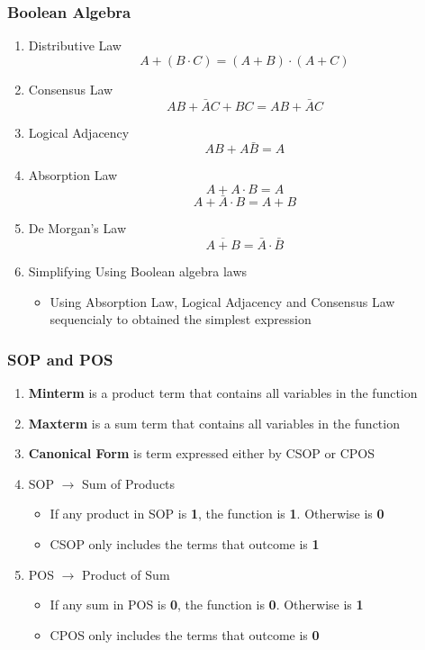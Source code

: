 \documentclass{article}
\begin{document}
\subsubsection{Boolean Algebra}
\begin{enumerate}
    \item Distributive Law
    \[A + (B \cdot C)=(A+B)\cdot(A+C)\]
    \item Consensus Law
    \[AB + \bar{A}C+BC=AB+\bar{A}C\]
    \item Logical Adjacency
    \[AB+A\bar{B}=A\]
    \item Absorption Law
    \[A+A\cdot B=A\]
    \[A+\bar{A} \cdot B=A+B\]
    \item De Morgan's Law
    \[\overline{A+B}=\bar{A} \cdot \bar{B}\]
    \item Simplifying Using Boolean algebra laws
    \begin{itemize}
        \item Using Absorption Law, Logical Adjacency and Consensus Law sequencialy to obtained the simplest expression
    \end{itemize}
\end{enumerate}

\subsubsection{SOP and POS}
\begin{enumerate}
    \item \textbf{Minterm} is a product term that contains all variables in the function
    \item \textbf{Maxterm} is a sum term that contains all variables in the function
    \item \textbf{Canonical Form} is term expressed either by CSOP or CPOS
    \item SOP $\rightarrow$ Sum of Products
    \begin{itemize}
        \item If any product in SOP is \textbf{1}, the function is \textbf{1}. Otherwise is \textbf{0}
        \item CSOP only includes the terms that outcome is \textbf{1}
    \end{itemize}
    \item POS $\rightarrow$ Product of Sum
        \begin{itemize}
            \item If any sum in POS is \textbf{0}, the function is \textbf{0}. Otherwise is \textbf{1}
            \item CPOS only includes the terms that outcome is \textbf{0}
        \end{itemize}
\end{enumerate}
\end{document}
